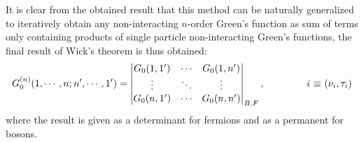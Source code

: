 It is clear from the obtained result that this method can be naturally generalized to iteratively obtain any non-interacting $n$-order Green's function as sum of terms only 
containing products of single particle non-interacting Green's functions, the final result of Wick's theorem is thus obtained:
\begin{equation}
    G_0^{(n)}(1,\cdots,n;n',\cdots,1')=\begin{vmatrix}
        G_0(1,1') & \cdots & G_0(1,n') \\
        \vdots & \ddots & \vdots \\
        G_0(n,1') & \cdots & G_0(n,n') \\
    \end{vmatrix}_{B,F},\hspace{1.5cm}\text{$i$ $\equiv$ $(\nu_i,\tau_i)$}
\end{equation}
where the result is given as a determinant for fermions and as a permanent for bosons.
